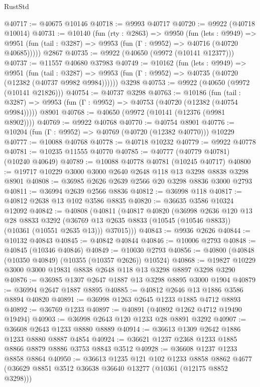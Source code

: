 \begin{lexlean}{RustStd}
\begin{coremodule}
@40717 := @40675 @10146
@40718 := @9993 @40717
@40720 := @9922 (@40718 @10014)
@40731 := @10140
    (fun (rty : @2863) =>
    @9950
      (fun (lets : @9949) =>
      @9951 (fun (tail : @3287) => @9953 (fun (Γ : @9952) => @40716 (@40720 @40685)))))
    @2867
@40735 := @9922 (@40650 (@9972 (@10141 @12377)))
@40737 := @11557 @40680 @37983
@40749 := @10162
    (fun (lets : @9949) =>
    @9951
      (fun (tail : @3287) =>
      @9953 (fun (Γ : @9952) => @40735 (@40720 (@12382 (@40737 @9982 @9984))))))
    @3298
@40753 := @9922 (@40650 (@9972 (@10141 @21826)))
@40754 := @40737 @3298
@40763 := @10186
    (fun (tail : @3287) => @9953 (fun (Γ : @9952) => @40753 (@40720 (@12382 (@40754 @9984)))))
    @8901
@40768 := @40650 (@9972 (@10141 (@12376 (@9981 @8902))))
@40769 := @9922 @40768
@40770 := @40754 @8901
@40776 := @10204 (fun (Γ : @9952) => @40769 (@40720 (@12382 @40770))) @10229
@40777 := @10088 @40768
@40778 := @40718 @10232
@40779 := @9922 @40778
@40781 := @10235 @11555 @40770
@40785 := @40777 (@40779 @40781) (@10240 @40649)
@40789 := @10088 @40778 @40781 (@10245 @40717)
@40800 := @19717 @10229 @3000 @3000 @2640 @2648 @118 @13 @3298 @8838 @3298 @8901
@40808 := @36985 @2626 @2639 @2566 @20 @3298 @8836 @3000 @2793
@40811 := @36994 @2639 @2566 @8836
@40812 := @36998 @118
@40817 := @40812 @2638 @13 @102 @3586 @8835
@40820 := @36635 @3586 @10324 @12092
@40842 := @40808
    (@40811
      (@40817
        @40820
        (@36998
          @2636
          @120
          @13
          @28
          @8833
          @3292
          (@36769 @13 @2635 @8833 (@10545 (@10546 @8833)) (@10361 (@10551 @2635 @13)))
          @37015)))
@40843 := @9936 @2626
@40844 := @10132 @40843
@40845 := @40842 @40844
@40846 := @10006 @2793
@40848 := @40845 (@10346 @40846)
@40849 := @10030 @2793
@40856 := @40800 (@40848 (@10350 @40849) (@10355 (@10357 @2626)) @10524)
@40868 := @19827 @10229 @3000 @3000 @19831 @8838 @2648 @118 @13 @3298 @8897 @3298 @3290
@40876 := @36985 @1307 @2647 @1887 @13 @3298 @8895 @3000 @1904
@40879 := @36994 @2647 @1887 @8895
@40885 := @40812 @2646 @13 @1886 @3586 @8894 @40820
@40891 := @36998 @1263 @2645 @1233 @1885 @4712 @8893
@40892 := @36769 @1233
@40897 := @40891 (@40892 @1262 @4712 @19490 @19494)
@40903 := @36998 @2643 @120 @1233 @28 @8891 @3292
@40907 := @36608 @2643 @1233 @8880 @8889
@40914 := @36613 @1309 @2642 @1886 @1233 @8880 @8887 @4854
@40924 := @36621 @1237 @2368 @1233 @1885 @8866 @8879 @8886 @3753 @8843 @3512
@40928 := @36608 @1237 @1233 @8858 @8864
@40950 := @36613
    @1235
    @121
    @102
    @1233
    @8858
    @8862
    @4677
    (@36629 @8851 @3512 @36638 @36640 @13277 (@10361 (@12175 @8852 @3298)))

\end{coremodule}
\end{lexlean}
